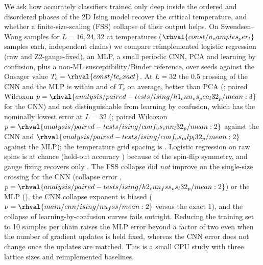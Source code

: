 We ask how accurately classifiers trained only deep inside the ordered and disordered phases of the 2D Ising model recover the critical temperature, and whether a finite-size-scaling (FSS) collapse of their output helps. On Swendsen--Wang samples for $L=16,24,32$ at  temperatures ($\rhval{const/n_samples_per_t}$ samples each,  independent chains) we compare reimplemented logistic regression (raw and Z2-gauge-fixed), an MLP, a small periodic CNN, PCA and learning by confusion, plus a non-ML susceptibility/Binder reference, over  seeds against the Onsager value $T_c=\rhval{const/tc_exact}$.
At $L=32$ the 0.5 crossing of the CNN and the MLP is within  and  of $T_c$ on average, better than PCA (; paired Wilcoxon $p=\rhval{analysis/paired-tests/ising/h1_cnn_vs_pca_l32_p/mean:3}$ for the CNN) and not distinguishable from learning by confusion, which has the nominally lowest error at $L=32$ (; paired Wilcoxon $p=\rhval{analysis/paired-tests/ising/conf_vs_cnn_l32_p/mean:2}$ against the CNN and $\rhval{analysis/paired-tests/ising/conf_vs_mlp_l32_p/mean:2}$ against the MLP); the temperature grid spacing is .
Logistic regression on raw spins is at chance (held-out accuracy ) because of the spin-flip symmetry, and gauge fixing recovers only .
The FSS collapse did \emph{not} improve on the single-size crossing for the CNN (collapse error , $p=\rhval{analysis/paired-tests/ising/h2_cnn_fss_vs_l32_p/mean:2}$) or the MLP (), the CNN collapse exponent is biased ($\nu=\rhval{main/cnn/ising/nu_fss/mean:2}$ versus the exact 1), and the collapse of learning-by-confusion curves fails outright.
Reducing the training set to 10 samples per chain raises the MLP error beyond a factor of two even when the number of gradient updates is held fixed, whereas the CNN error does not change once the updates are matched. This is a small CPU study with three lattice sizes and reimplemented baselines.
